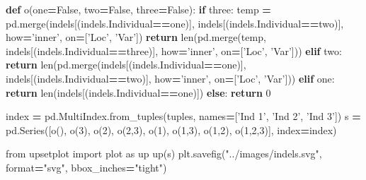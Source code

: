 \documentclass[]{book}
\newenvironment{Shaded}{\begin{snugshade}}{\end{snugshade}}
\newcommand{\KeywordTok}[1]{\textcolor[rgb]{0.13,0.29,0.53}{\textbf{#1}}}
\newcommand{\DecValTok}[1]{\textcolor[rgb]{0.00,0.00,0.81}{#1}}
\newcommand{\StringTok}[1]{\textcolor[rgb]{0.31,0.60,0.02}{#1}}
\newcommand{\ImportTok}[1]{#1}
\newcommand{\VariableTok}[1]{\textcolor[rgb]{0.00,0.00,0.00}{#1}}
\newcommand{\ControlFlowTok}[1]{\textcolor[rgb]{0.13,0.29,0.53}{\textbf{#1}}}
\newcommand{\OperatorTok}[1]{\textcolor[rgb]{0.81,0.36,0.00}{\textbf{#1}}}
\newcommand{\BuiltInTok}[1]{#1}
\newcommand{\NormalTok}[1]{#1}
\begin{document}
\begin{Shaded}
\begin{Highlighting}[]
\KeywordTok{def}\NormalTok{ o(one}\OperatorTok{=}\VariableTok{False}\NormalTok{, two}\OperatorTok{=}\VariableTok{False}\NormalTok{, three}\OperatorTok{=}\VariableTok{False}\NormalTok{):}
    \ControlFlowTok{if}\NormalTok{ three:}
\NormalTok{        temp }\OperatorTok{=}\NormalTok{ pd.merge(indels[(indels.Individual}\OperatorTok{==}\NormalTok{one)], indels[(indels.Individual}\OperatorTok{==}\NormalTok{two)], how}\OperatorTok{=}\StringTok{'inner'}\NormalTok{, on}\OperatorTok{=}\NormalTok{[}\StringTok{'Loc'}\NormalTok{, }\StringTok{'Var'}\NormalTok{])}
        \ControlFlowTok{return} \BuiltInTok{len}\NormalTok{(pd.merge(temp, indels[(indels.Individual}\OperatorTok{==}\NormalTok{three)], how}\OperatorTok{=}\StringTok{'inner'}\NormalTok{, on}\OperatorTok{=}\NormalTok{[}\StringTok{'Loc'}\NormalTok{, }\StringTok{'Var'}\NormalTok{]))}
    \ControlFlowTok{elif}\NormalTok{ two:}
        \ControlFlowTok{return} \BuiltInTok{len}\NormalTok{(pd.merge(indels[(indels.Individual}\OperatorTok{==}\NormalTok{one)], indels[(indels.Individual}\OperatorTok{==}\NormalTok{two)], how}\OperatorTok{=}\StringTok{'inner'}\NormalTok{, on}\OperatorTok{=}\NormalTok{[}\StringTok{'Loc'}\NormalTok{, }\StringTok{'Var'}\NormalTok{]))}
    \ControlFlowTok{elif}\NormalTok{ one:}
        \ControlFlowTok{return} \BuiltInTok{len}\NormalTok{(indels[(indels.Individual}\OperatorTok{==}\NormalTok{one)])}
    \ControlFlowTok{else}\NormalTok{:}
        \ControlFlowTok{return} \DecValTok{0}

\NormalTok{index }\OperatorTok{=}\NormalTok{ pd.MultiIndex.from_tuples(tuples, names}\OperatorTok{=}\NormalTok{[}\StringTok{'Ind 1'}\NormalTok{, }\StringTok{'Ind 2'}\NormalTok{, }\StringTok{'Ind 3'}\NormalTok{])}
\NormalTok{s }\OperatorTok{=}\NormalTok{ pd.Series([o(),}
\NormalTok{               o(}\DecValTok{3}\NormalTok{),}
\NormalTok{               o(}\DecValTok{2}\NormalTok{),}
\NormalTok{               o(}\DecValTok{2}\NormalTok{,}\DecValTok{3}\NormalTok{),}
\NormalTok{               o(}\DecValTok{1}\NormalTok{),}
\NormalTok{               o(}\DecValTok{1}\NormalTok{,}\DecValTok{3}\NormalTok{),}
\NormalTok{               o(}\DecValTok{1}\NormalTok{,}\DecValTok{2}\NormalTok{),}
\NormalTok{               o(}\DecValTok{1}\NormalTok{,}\DecValTok{2}\NormalTok{,}\DecValTok{3}\NormalTok{)], index}\OperatorTok{=}\NormalTok{index)}

\ImportTok{from}\NormalTok{ upsetplot }\ImportTok{import}\NormalTok{ plot }\ImportTok{as}\NormalTok{ up}
\NormalTok{up(s)}
\NormalTok{plt.savefig(}\StringTok{"../images/indels.svg"}\NormalTok{, }\BuiltInTok{format}\OperatorTok{=}\StringTok{"svg"}\NormalTok{, bbox_inches}\OperatorTok{=}\StringTok{"tight"}\NormalTok{)}
\end{Highlighting}
\end{Shaded}
\end{document}
